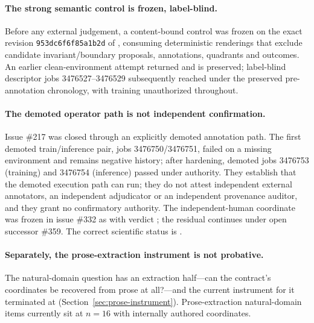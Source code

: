 \paragraph{The strong semantic control is frozen, label-blind.} Before any external judgement, a content-bound control was frozen on the exact revision \texttt{953dc6f6f85a1b2d} of , consuming deterministic renderings that exclude candidate invariant/boundary proposals, annotations, quadrants and outcomes. An earlier clean-environment attempt returned  and is preserved; label-blind descriptor jobs 3476527--3476529 subsequently reached  under the preserved pre-annotation chronology, with training unauthorized throughout.

\paragraph{The demoted operator path is not independent confirmation.} Issue \#217 was closed through an explicitly demoted  annotation path. The first demoted train/inference pair, jobs 3476750/3476751, failed on a missing  environment and remains negative history; after hardening, demoted jobs 3476753 (training) and 3476754 (inference) passed under  authority. They establish that the demoted execution path can run; they do not attest independent external annotators, an independent adjudicator or an independent provenance auditor, and they grant no confirmatory authority. The independent-human coordinate was frozen in issue \#332 as  with verdict ; the residual continues under open successor \#359. The correct scientific status is .

\paragraph{Separately, the prose-extraction instrument is not probative.} The natural-domain question has an extraction half---can the contract's coordinates be recovered from prose at all?---and the current instrument for it terminated at  (Section~\ref{sec:prose-instrument}). Prose-extraction natural-domain items currently sit at $n=16$ with internally authored coordinates.


